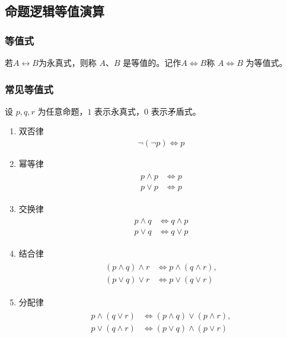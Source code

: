 \subsection{命题逻辑等值演算}

\subsubsection{等值式}

若$A \leftrightarrow B$为永真式，则称 $A$、$B$ 是等值的。记作$A \Leftrightarrow B$称 $A \Leftrightarrow B$ 为等值式。

\subsubsection{常见等值式}
设 $p,q,r$ 为任意命题，$1$ 表示永真式，$0$ 表示矛盾式。
\begin{enumerate}
	\item 双否律
	\begin{align*}
		\neg(\neg p) \Leftrightarrow p
	\end{align*}
	
	\item 幂等律
	\begin{align*}
		\begin{aligned}
			p \land p &\Leftrightarrow p \\
			p \lor p &\Leftrightarrow p
		\end{aligned}
	\end{align*}
	
	\item 交换律
	\begin{align*}
		\begin{aligned}
			p \land q &\Leftrightarrow q \land p \\
			p \lor q &\Leftrightarrow q \lor p
		\end{aligned}
	\end{align*}
	
	\item 结合律
	\begin{align*}
		\begin{aligned}
			(p \land q) \land r &\Leftrightarrow p \land (q \land r),\\
			(p \lor q) \lor r &\Leftrightarrow p \lor (q \lor r)
		\end{aligned}
	\end{align*}
	
	\item 分配律
	\begin{align*}
		\begin{aligned}
			p \land (q \lor r) &\Leftrightarrow (p \land q) \lor (p \land r),\\
			p \lor (q \land r) &\Leftrightarrow (p \lor q) \land (p \lor r)
		\end{aligned}
	\end{align*}
	

\end{enumerate}
